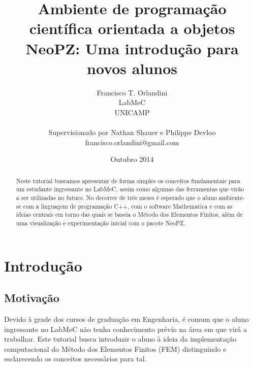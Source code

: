 \documentclass[11pt, oneside]{article}   	%
\title{Ambiente de programação científica orientada a objetos NeoPZ: Uma introdução para novos alunos}
\author{Francisco T. Orlandini\\
LabMeC\\
UNICAMP\\
\\
Supervisionado por Nathan Shauer e Philippe Devloo
\\
francisco.orlandini@gmail.com}
\date{Outubro 2014}							%
\begin{document}
\maketitle

\begin{abstract}
Neste tutorial buscamos apresentar de forma simples os conceitos fundamentais para um estudante ingressante no LabMeC, assim como algumas das ferramentas que virão a ser utilizadas no futuro. No decorrer de três meses é esperado que o aluno ambiente-se com a linguagem de programação C++, com o software Mathematica e com as ideias centrais em torno das quais se baseia o Método dos Elementos Finitos, além de uma visualização e experimentação inicial com o pacote NeoPZ.
\end{abstract}
\newpage
\tableofcontents
\newpage

\section{Introdução}
\subsection{Motivação}
Devido à grade dos cursos de graduação em Engenharia, é comum que o aluno ingressante no LabMeC não tenha conhecimento prévio na área em que virá a trabalhar. Este tutorial busca introduzir o aluno à ideia da implementação computacional do Método dos Elementos Finitos (FEM) distinguindo e esclarecendo os conceitos necessários para tal. 
\end{document}
